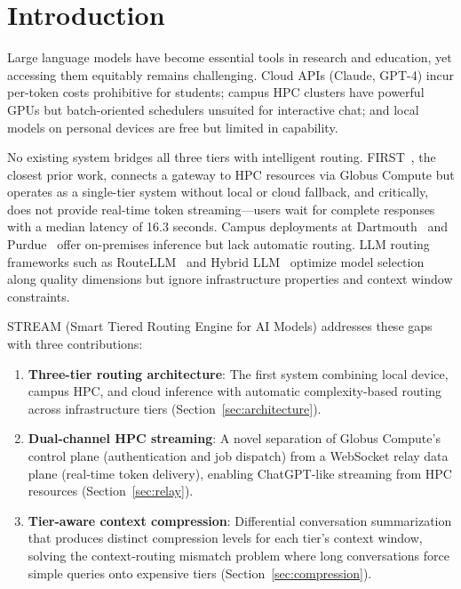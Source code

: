\documentclass[manuscript, review]{acmart}
\begin{document}
\section{Introduction}

Large language models have become essential tools in research and education, yet accessing them equitably remains challenging. Cloud APIs (Claude, GPT-4) incur per-token costs prohibitive for students; campus HPC clusters have powerful GPUs but batch-oriented schedulers unsuited for interactive chat; and local models on personal devices are free but limited in capability.

No existing system bridges all three tiers with intelligent routing. FIRST~\cite{first2025}, the closest prior work, connects a gateway to HPC resources via Globus Compute but operates as a single-tier system without local or cloud fallback, and critically, does not provide real-time token streaming---users wait for complete responses with a median latency of 16.3 seconds. Campus deployments at Dartmouth~\cite{dartmouth2025} and Purdue~\cite{purdue2025} offer on-premises inference but lack automatic routing. LLM routing frameworks such as RouteLLM~\cite{routellm2024} and Hybrid LLM~\cite{hybridllm2024} optimize model selection along quality dimensions but ignore infrastructure properties and context window constraints.

STREAM (Smart Tiered Routing Engine for AI Models) addresses these gaps with three contributions:

\begin{enumerate}
    \item \textbf{Three-tier routing architecture}: The first system combining local device, campus HPC, and cloud inference with automatic complexity-based routing across infrastructure tiers (Section~\ref{sec:architecture}).

    \item \textbf{Dual-channel HPC streaming}: A novel separation of Globus Compute's control plane (authentication and job dispatch) from a WebSocket relay data plane (real-time token delivery), enabling ChatGPT-like streaming from HPC resources (Section~\ref{sec:relay}).

    \item \textbf{Tier-aware context compression}: Differential conversation summarization that produces distinct compression levels for each tier's context window, solving the context-routing mismatch problem where long conversations force simple queries onto expensive tiers (Section~\ref{sec:compression}).

\end{enumerate}
\end{document}
